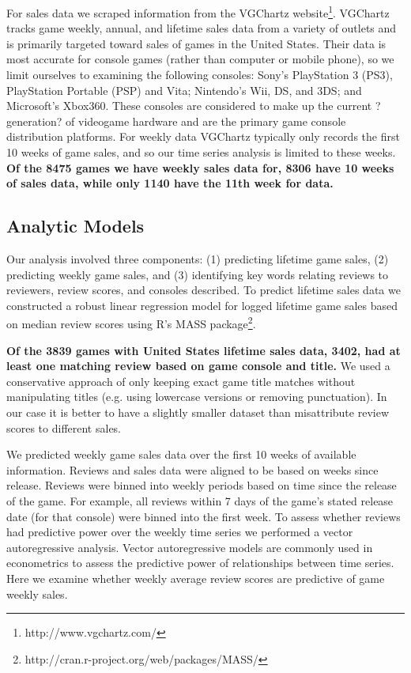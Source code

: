 \documentclass[letterpaper]{article}
\begin{document}
For sales data we scraped information from the VGChartz website\footnote{http://www.vgchartz.com/}. VGChartz tracks game weekly, annual, and lifetime sales data from a variety of outlets and is primarily targeted toward sales of games in the United States. Their data is most accurate for console games (rather than computer or mobile phone), so we limit ourselves to examining the following consoles: Sony's PlayStation 3 (PS3), PlayStation Portable (PSP) and Vita; Nintendo's Wii, DS, and 3DS; and Microsoft's Xbox360. These consoles are considered to make up the current ?generation? of videogame hardware and are the primary game console distribution platforms. For weekly data VGChartz typically only records the first 10 weeks of game sales, and so our time series analysis is limited to these weeks. \textbf{Of the 8475 games we have weekly sales data for, 8306 have 10 weeks of sales data, while only 1140 have the 11th week for data.}

\subsection{Analytic Models}
Our analysis involved three components: (1) predicting lifetime game sales, (2) predicting weekly game sales, and (3) identifying key words relating reviews to reviewers, review scores, and consoles described. To predict lifetime sales data we constructed a robust linear regression model for logged lifetime game sales based on median review scores using R's MASS package\footnote{http://cran.r-project.org/web/packages/MASS/}.

\textbf{Of the 3839 games with United States lifetime sales data, 3402, had at least one matching review based on game console and title.} We used a conservative approach of only keeping exact game title matches without manipulating titles (e.g. using lowercase versions or removing punctuation). In our case it is better to have a slightly smaller dataset than misattribute review scores to different sales.

We predicted weekly game sales data over the first 10 weeks of available information. Reviews and sales data were aligned to be based on weeks since release. Reviews were binned into weekly periods based on time since the release of the game. For example, all reviews within 7 days of the game's stated release date (for that console) were binned into the first week. To assess whether reviews had predictive power over the weekly time series we performed a vector autoregressive analysis. Vector autoregressive models are commonly used in econometrics to assess the predictive power of relationships between time series. Here we examine whether weekly average review scores are predictive of game weekly sales.
\end{document}
